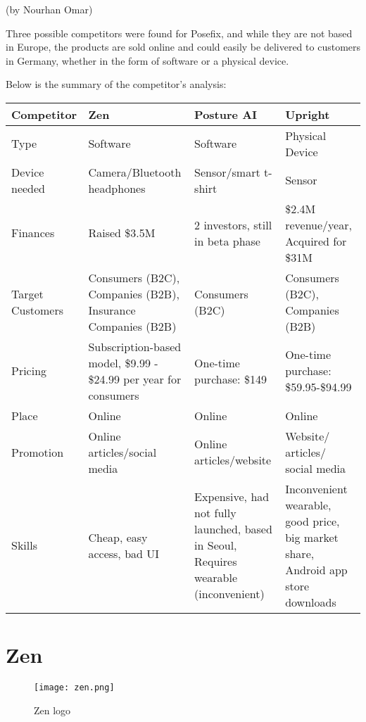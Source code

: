 (by Nourhan Omar)

\p
Three possible competitors were found for Posefix, and while they are not based in Europe, 
the products are sold online and could easily be delivered to customers in Germany, whether in the form of software or a physical device.

\p
Below is the summary of the competitor's analysis:

\begin{table}[ht]
    \centering
    \begin{tabular}{|p{3cm}|p{3cm}|p{3cm}|p{3cm}|}
        \hline
        \textbf{Competitor} & \textbf{Zen} & \textbf{Posture AI} & \textbf{Upright} \\
        \hline
        Type & Software & Software & Physical Device \\
        \hline
        Device needed & Camera/Bluetooth headphones & Sensor/smart t-shirt & Sensor \\
        \hline
        Finances & Raised \$3.5M & 2 investors, still in beta phase & \$2.4M revenue/year, Acquired for \$31M \\
        \hline
        Target Customers & Consumers (B2C), Companies (B2B), Insurance Companies (B2B) & Consumers (B2C) & Consumers (B2C), Companies (B2B) \\
        \hline
        Pricing & Subscription-based model, \$9.99 - \$24.99 per year for consumers & One-time purchase: \$149 & One-time purchase: \$59.95-\$94.99 \\
        \hline
        Place & Online & Online & Online \\
        \hline
        Promotion & Online articles/social media & Online articles/website & Website/ articles/ social media \\
        \hline
        Skills & Cheap, easy access, bad UI & Expensive, had not fully launched, based in Seoul, Requires wearable (inconvenient) & Inconvenient wearable, good price, big market share, Android app store downloads \\
        \hline
    \end{tabular}
\end{table}    

\section{Zen}

\begin{figure}[H]
    \centering
    \texttt{[image: zen.png]}
    \caption{Zen logo}
    \label{fig:zen}
\end{figure}

